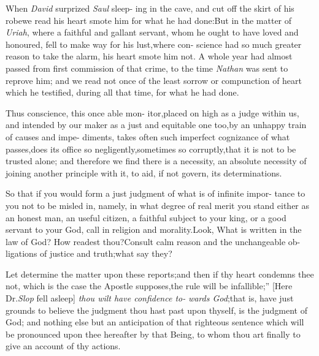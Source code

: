 \documentclass{article}
\begin{document}
\lqq When \textit{David} surprized \textit{Saul} sleep-\break
\lqq ing in the cave, and cut off the skirt\break
\lqq of his robe\tsk we read his heart smote\break
\lqq him for what he had done:\tsh But in\break
\lqq the matter of \textit{Uriah}, where a faithful\break
\lqq and gallant servant, whom he ought\break
\lqq to have loved and honoured, fell to\break
\lqq make way for his lust,\tsk where con-
\lqq science had so much greater reason to\break
\lqq take the alarm, his heart smote him\break
\lqq not.  A whole year had almost passed\break
\lqq from first commission of that crime,\break
\lqq to the time \textit{Nathan} was sent to reprove\break
\lqq him; and we read not once of the least\break
\lqq sorrow or compunction of heart which\break
\lqq he testified, during all that time, for\break
\lqq what he had done.

\lqq Thus conscience, this once able mon-\break
\lqq itor,\tsh placed on high as a judge\break
\lqq within us, and intended by our maker\break
\lqq as a just and equitable one too,\tsk by\break
\lqq an unhappy train of causes and impe-\break
\lqq diments, takes often such imperfect\break
\lqq cognizance of what passes,\tsh does its\break
\lqq office so negligently,\tsh sometimes so\break
\lqq corruptly,\tsk that it is not to be trusted\break
\lqq alone; and therefore we find there is\break
\lqq a necessity, an absolute necessity of
\lqq joining another principle with it, to aid,\break
\lqq if not govern, its determinations.

\lqq So that if you would form a just\break
\lqq judgment of what is of infinite impor-\break
\lqq tance to you not to be misled in,\tsh\break
\lqq namely, in what degree of real merit\break
\lqq you stand either as an honest man, an\break
\lqq useful citizen, a faithful subject to your\break
\lqq king, or a good servant to your God,\tsk\break
\lqq call in religion and morality.\tsk Look,\break
\lqq \tsk What is written in the law of God?\break
\lqq \tsh How readest thou?\tsh Consult\break
\lqq calm reason and the unchangeable ob-\break
\lqq ligations of justice and truth;\tsk what\break
\lqq say they?

\lqq Let  determine the\break
\lqq matter upon these reports;\tsk and then\break
\lqq if thy heart condemns thee not, which\break
\lqq is the case the Apostle supposes,\tsh the
\lqq rule will be infallible;” [Here Dr.\@ \textit{Slop}\break
fell asleep] \lqq \textit{thou wilt have confidence to-}\break
\lqq \textit{wards God};\tsk that is, have just grounds\break
\lqq to believe the judgment thou hast past\break
\lqq upon thyself, is the judgment of God;\break
\lqq and nothing else but an anticipation\break
\lqq of that righteous sentence which will\break
\lqq be pronounced upon thee hereafter by\break
\lqq that Being, to whom thou art finally\break
\lqq to give an account of thy actions.
\end{document}
